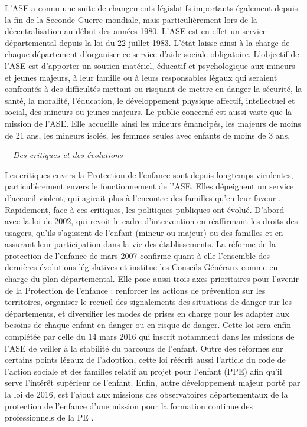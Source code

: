 \documentclass[
  12,
  a4paper,
]{report}
\begin{document}
L'ASE a connu une suite de changements législatifs importants également
depuis la fin de la Seconde Guerre mondiale, mais particulièrement lors
de la décentralisation au début des années 1980. L'ASE est en effet un
service départemental depuis la loi du 22 juillet 1983. L'état laisse
ainsi à la charge de chaque département d'organiser ce service d'aide
sociale obligatoire. L'objectif de l'ASE est d'apporter un soutien
matériel, éducatif et psychologique aux mineurs et jeunes majeurs, à
leur famille ou à leurs responsables légaux qui seraient confrontés à
des difficultés mettant ou risquant de mettre en danger la sécurité, la
santé, la moralité, l'éducation, le développement physique affectif,
intellectuel et social, des mineurs ou jeunes majeurs. Le public
concerné est aussi vaste que la mission de l'ASE. Elle accueille ainsi
les mineurs émancipés, les majeurs de moins de 21 ans, les mineurs
isolés, les femmes seules avec enfants de moins de 3 ans.

~~\emph{Des critiques et des évolutions}

Les critiques envers la Protection de l'enfance sont depuis longtemps
virulentes, particulièrement envers le fonctionnement de l'ASE. Elles
dépeignent un service d'accueil violent, qui agirait plus à l'encontre
des familles qu'en leur faveur . Rapidement, face à ces critiques, les
politiques publiques ont évolué. D'abord avec la loi de 2002, qui revoit
le cadre d'intervention en réaffirmant les droits des usagers, qu'ils
s'agissent de l'enfant (mineur ou majeur) ou des familles et en assurant
leur participation dans la vie des établissements. La réforme de la
protection de l'enfance de mars 2007 confirme quant à elle l'ensemble
des dernières évolutions législatives et institue les Conseils Généraux
comme en charge du plan départemental. Elle pose aussi trois axes
prioritaires pour l'avenir de la Protection de l'enfance : renforcer les
actions de prévention sur les territoires, organiser le recueil des
signalements des situations de danger sur les départements, et
diversifier les modes de prises en charge pour les adapter aux besoins
de chaque enfant en danger ou en risque de danger. Cette loi sera enfin
complétée par celle du 14 mars 2016 qui inscrit notamment dans les
missions de l'ASE de veiller à la stabilité du parcours de l'enfant.
Outre des réformes sur certains points légaux de l'adoption, cette loi
réécrit aussi l'article du code de l'action sociale et des familles
relatif au projet pour l'enfant (PPE) afin qu'il serve l'intérêt
supérieur de l'enfant. Enfin, autre développement majeur porté par la
loi de 2016, est l'ajout aux missions des observatoires départementaux
de la protection de l'enfance d'une mission pour la formation continue
des professionnels de la PE .
\end{document}
